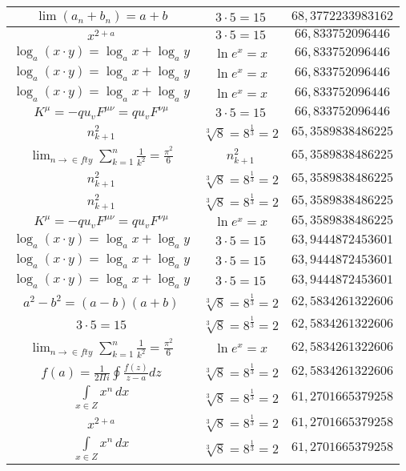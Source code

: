 \documentclass{article}
\begin{document}
\begin{flushleft}
\begin{longtable}{|c|c|c|}
$\lim\left(a_n+b_n\right)=a+b$ & $3\cdot 5=15$ & $68,3772233983162$ \\ \hline 
$x^{2+a}$ & $3\cdot 5=15$ & $66,833752096446$ \\ \hline 
$\log_{a}(x\cdot y)=\log_{a}x+\log_{a}y$ & $\ln e^x=x$ & $66,833752096446$ \\ \hline 
$\log_{a}(x\cdot y)=\log_{a}x+\log_{a}y$ & $\ln e^x=x$ & $66,833752096446$ \\ \hline 
$\log_{a}(x\cdot y)=\log_{a}x+\log_{a}y$ & $\ln e^x=x$ & $66,833752096446$ \\ \hline 
$K^\mu=-qu_vF^{\mu\nu}=qu_vF^{\nu\mu}$ & $3\cdot 5=15$ & $66,833752096446$ \\ \hline 
$n_{k+1}^2$ & $\sqrt[3]{8}=8^{\frac{1}{3}}=2$ & $65,3589838486225$ \\ \hline 
$\lim_{n\to\in fty}\sum_{k=1}^n\frac{1}{k^2}=\frac{\pi^2}{6}$ & $n_{k+1}^2$ & $65,3589838486225$ \\ \hline 
$n_{k+1}^2$ & $\sqrt[3]{8}=8^{\frac{1}{3}}=2$ & $65,3589838486225$ \\ \hline 
$n_{k+1}^2$ & $\sqrt[3]{8}=8^{\frac{1}{3}}=2$ & $65,3589838486225$ \\ \hline 
$K^\mu=-qu_vF^{\mu\nu}=qu_vF^{\nu\mu}$ & $\ln e^x=x$ & $65,3589838486225$ \\ \hline 
$\log_{a}(x\cdot y)=\log_{a}x+\log_{a}y$ & $3\cdot 5=15$ & $63,9444872453601$ \\ \hline 
$\log_{a}(x\cdot y)=\log_{a}x+\log_{a}y$ & $3\cdot 5=15$ & $63,9444872453601$ \\ \hline 
$\log_{a}(x\cdot y)=\log_{a}x+\log_{a}y$ & $3\cdot 5=15$ & $63,9444872453601$ \\ \hline 
$a^2-b^2=(a-b)(a+b)$ & $\sqrt[3]{8}=8^{\frac{1}{3}}=2$ & $62,5834261322606$ \\ \hline 
$3\cdot 5=15$ & $\sqrt[3]{8}=8^{\frac{1}{3}}=2$ & $62,5834261322606$ \\ \hline 
$\lim_{n\to\in fty}\sum_{k=1}^n\frac{1}{k^2}=\frac{\pi^2}{6}$ & $\ln e^x=x$ & $62,5834261322606$ \\ \hline 
$f\left(a\right)=\frac{1}{2\Pi i}\oint\frac{f\left(z\right)}{z-a}dz$ & $\sqrt[3]{8}=8^{\frac{1}{3}}=2$ & $62,5834261322606$ \\ \hline 
$\int \limits_{x\in Z}\!x^{n}\,dx$ & $\sqrt[3]{8}=8^{\frac{1}{3}}=2$ & $61,2701665379258$ \\ \hline 
$x^{2+a}$ & $\sqrt[3]{8}=8^{\frac{1}{3}}=2$ & $61,2701665379258$ \\ \hline 
$\int \limits_{x\in Z}\!x^{n}\,dx$ & $\sqrt[3]{8}=8^{\frac{1}{3}}=2$ & $61,2701665379258$ \\ \hline 

\end{longtable}
\end{flushleft}
\end{document}
